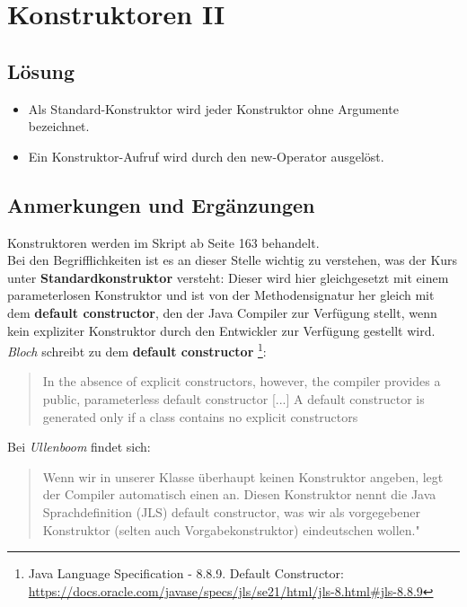 \chapter{Konstruktoren II}\label{konstruktoren}

\section*{Lösung}

\begin{itemize}
    \item Als Standard-Konstruktor wird jeder Konstruktor ohne Argumente bezeichnet.
    \item Ein Konstruktor-Aufruf wird durch den new-Operator ausgelöst.
\end{itemize}


\section*{Anmerkungen und Ergänzungen}

Konstruktoren werden im Skript ab Seite 163 behandelt.\\

Bei den Begrifflichkeiten ist es an dieser Stelle wichtig zu verstehen, was der Kurs unter \textbf{Standardkonstruktor}
versteht: Dieser wird hier gleichgesetzt mit einem parameterlosen Konstruktor und ist von der Methodensignatur her
gleich mit dem \textbf{default constructor}, den der Java Compiler zur Verfügung stellt, wenn kein expliziter Konstruktor
durch den Entwickler zur Verfügung gestellt wird.\\

\textit{Bloch} schreibt zu dem \textbf{default constructor} \footnote{
    Java Language Specification - 8.8.9. Default Constructor: \url{https://docs.oracle.com/javase/specs/jls/se21/html/jls-8.html#jls-8.8.9}
}:

\blockquote[{\cite[19 f.]{Blo17}}]{
    In the absence of explicit constructors, however, the compiler provides a public, parameterless default constructor [...]
    A default constructor is generated only if a class contains no explicit constructors
}

Bei \textit{Ullenboom} findet sich:

\blockquote[{\cite[515]{Ull12}}]{
    Wenn wir in unserer Klasse überhaupt keinen Konstruktor angeben, legt der Compiler automatisch einen an. Diesen
    Konstruktor nennt die Java Sprachdefinition (JLS) default constructor, was wir als vorgegebener Konstruktor
    (selten auch Vorgabekonstruktor) eindeutschen wollen."
}

